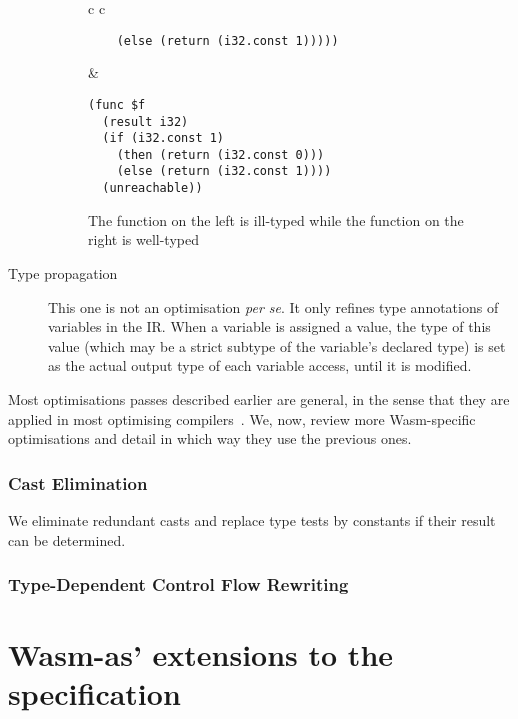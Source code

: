 \documentclass[10pt]{article}
\begin{document}
\begin{description}
\begin{figure}[h]
\begin{tabular}{c c}
\begin{minipage}{2.8in}
\begin{verbatim}
    (else (return (i32.const 1)))))
\end{verbatim}
\end{minipage}
&\begin{minipage}{2.8in}
\begin{verbatim}
(func $f
  (result i32)
  (if (i32.const 1)
    (then (return (i32.const 0)))
    (else (return (i32.const 1))))
  (unreachable))
\end{verbatim}
\end{minipage}
\end{tabular}
\caption{The function on the left is ill-typed while the function on the right
  is well-typed}\label{unreachable}
\end{figure}
  \item[Type propagation] This one is not an optimisation \emph{per se}. It only
    refines type annotations of variables in the IR. When a variable is assigned
    a value, the type of this value (which may be a strict subtype of the
    variable's declared type) is set as the actual output type of each variable
    access, until it is modified.
\end{description}

Most optimisations passes described earlier are general, in the sense that they
are applied in most optimising compilers~\cite{muchnick1997advanced}. We, now,
review more Wasm-specific optimisations and detail in which way they use the
previous ones.
\subsubsection{Cast Elimination}
We eliminate redundant casts and replace type tests by constants if their result
can be determined.

\subsubsection{Type-Dependent Control Flow Rewriting}\label{broncast}

\printbibliography
\newpage
\appendix
\section{Wasm-as' extensions to the specification}\label{wasmasex}
\end{document}
